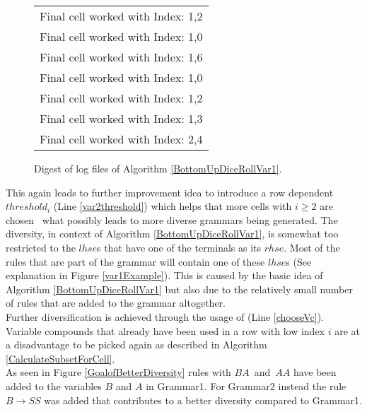 \begin{figure}[h]
	\centering
		\begin{tabular}{l}
			Final cell worked with Index: 1,2\\
			Final cell worked with Index: 1,0\\
			Final cell worked with Index: 1,6 \\
			Final cell worked with Index: 1,0\\
			Final cell worked with Index: 1,2\\
			Final cell worked with Index: 1,3\\
			Final cell worked with Index: 2,4\\
	\end{tabular}
	\caption{Digest of log files of Algorithm \ref{BottomUpDiceRollVar1}.}
	\label{logsVar1}
\end{figure}
\noindent This again leads to further improvement idea to introduce a row dependent $threshold_i$ (Line \ref{var2threshold}) which helps that more cells with $i\geq2$ are chosen \textendash~what possibly leads to more diverse grammars being generated. The diversity, in context of Algorithm \ref{BottomUpDiceRollVar1}, is somewhat too restricted to the $lhse$s that have one of the terminals as its $rhse$. Most of the rules that are part of the grammar will contain one of these $lhse$s (See explanation in Figure \ref{var1Example}). This is caused by the basic idea of Algorithm \ref{BottomUpDiceRollVar1} but also due to the relatively small number of rules that are added to the grammar altogether. \\
Further diversification is achieved through the usage of  (Line \ref{chooseVc}). Variable compounds that already have been used in a row with low index $i$ are at a disadvantage to be picked again as described in Algorithm \ref{CalculateSubsetForCell}.\\
As seen in Figure \ref{GoalofBetterDiversity} rules with $BA$~and~$AA$ have been added to the variables $B$ and $A$ in Grammar1. For Grammar2 instead the rule $B\rightarrow SS$ was added that contributes to a better diversity compared to Grammar1.
\noindent
